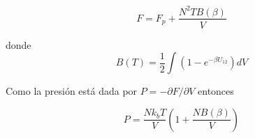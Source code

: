 \begin{equation}
    F = F_p + \frac{N^2TB(\beta)}{V}
\end{equation}

donde
\begin{equation}
    B(T) = \frac{1}{2}\int\left(1 - e^{-\beta U_{12}}\right)dV
\end{equation}

Como la presión está dada por $P = - \partial F / \partial V$ entonces

\begin{equation}
    P = \frac{N k_b T}{V} \left(1 + \frac{NB(\beta)}{V}\right)
\end{equation}